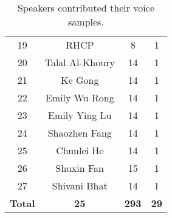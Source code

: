 \begin{table}
\begin{minipage}[b]{\textwidth}
\begin{tabular}{|c|c|c|c|}
19          & RHCP               & 8                & 1 \\
20          & Talal Al-Khoury    & 14               & 1 \\
21          & Ke Gong            & 14               & 1 \\
22          & Emily Wu Rong      & 14               & 1 \\
23          & Emily Ying Lu      & 14               & 1 \\
24          & Shaozhen Fang      & 14               & 1 \\
25          & Chunlei He         & 14               & 1 \\
26          & Shuxin Fan         & 15               & 1 \\
27          & Shivani Bhat       & 14               & 1 \\ \hline\hline
{\bf Total} & {\bf 25}           & {\bf 293}        & {\bf 29} \\ \hline
\end{tabular}
\end{minipage}
\caption{Speakers contributed their voice samples.}
\label{tab:samples}
\end{table}

